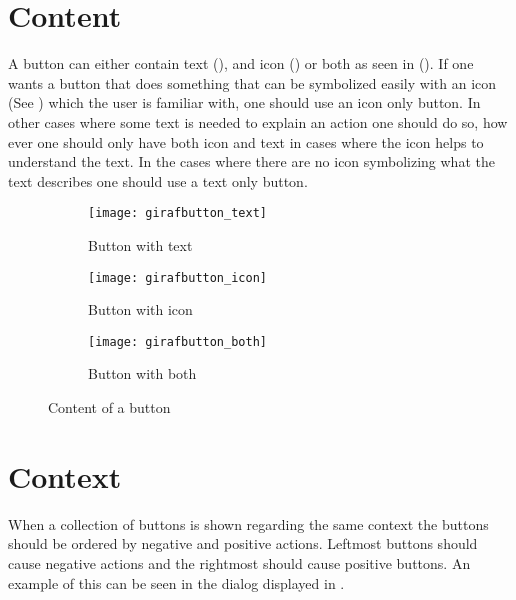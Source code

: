 \section{Content}
\label{sec:button_content}

A button can either contain text (), and icon () or both as seen in (). If one wants a button that does something that can be symbolized easily with an icon (See ) which the user is familiar with, one should use an icon only button. In other cases where some text is needed to explain an action one should do so, how ever one should only have both icon and text in cases where the icon helps to understand the text. In the cases where there are no icon symbolizing what the text describes one should use a text only button.

\begin{figure}[!htbp]
    \centering

    \begin{subfigure}[t]{0.3\textwidth}
    	\centering
        \texttt{[image: girafbutton\_text]}
        \caption{Button with text}
        \label{fig:girafbutton_text}
    \end{subfigure}
    \hspace{1em} 
    \begin{subfigure}[t]{0.3\textwidth}
    	\centering
        \texttt{[image: girafbutton\_icon]}
        \caption{Button with icon}
        \label{fig:girafbutton_icon}
    \end{subfigure}
    \hspace{1em} 
    \begin{subfigure}[t]{0.3\textwidth}
    	\centering
        \texttt{[image: girafbutton\_both]}
        \caption{Button with both}
        \label{fig:girafbutton_both}
    \end{subfigure}
    
    \caption{Content of a button}
    \label{fig:girafbutton_content}
\end{figure}

\section{Context}
\label{sec:button_context}

When a collection of buttons is shown regarding the same context the buttons should be ordered by negative and positive actions. Leftmost buttons should cause negative actions and the rightmost should cause positive buttons. An example of this can be seen in the dialog displayed in .